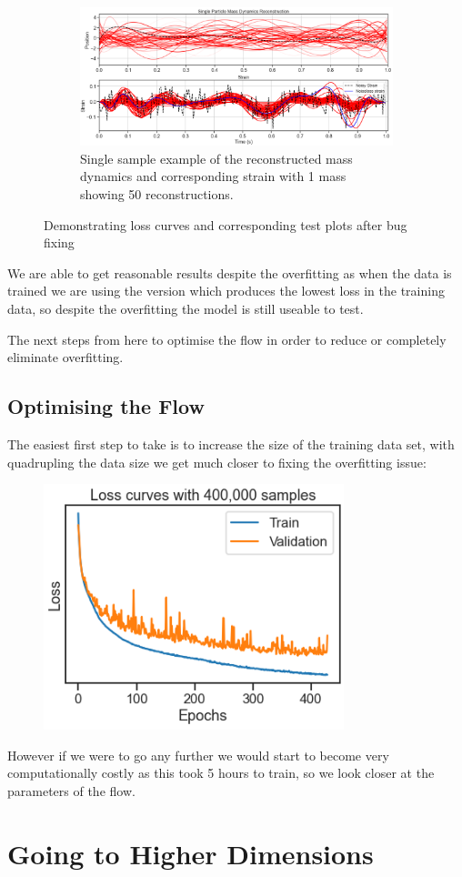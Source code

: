 \documentclass[a4paper, 12pt]{article}
\begin{document}
\begin{figure}[H]
\begin{subfigure}{.4\textwidth}
    \label{fig:massreccenter}
\end{subfigure} \hfill
\begin{subfigure}{.4\textwidth}
    \centering
    \includegraphics[width=1.1\textwidth, scale = 0.5]{superimpstrains.PNG}
    \caption{Single sample example of the reconstructed mass dynamics and corresponding strain with 1 mass showing 50 reconstructions.}
    \label{fig:massrec50center}
\end{subfigure}%
\centering
\caption{Demonstrating loss curves and corresponding test plots after bug fixing}

\end{figure}

We are able to get reasonable results despite the overfitting as when the data is trained we are using the version which produces the lowest loss in the training data, so despite the overfitting the model is still useable to test.

The next steps from here to optimise the flow in order to reduce or completely eliminate overfitting.

\subsection{Optimising the Flow}

The easiest first step to take is to increase the size of the training data set, with quadrupling the data size we get much closer to fixing the overfitting issue:

\begin{figure}[H]
  \includegraphics[scale = 0.8]{loss400k}
  \caption{}
  \label{}
\end{figure}

However if we were to go any further we would start to become very computationally costly as this took 5 hours to train, so we look closer at the parameters of the flow.

\section{Going to Higher Dimensions}
\end{document}
